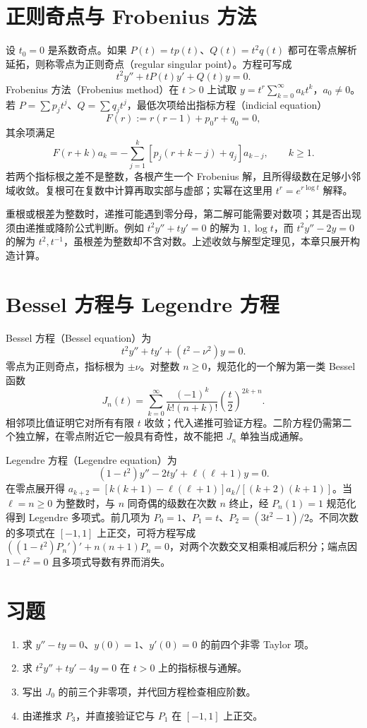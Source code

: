 \section{正则奇点与 Frobenius 方法}
设 $t_0=0$ 是系数奇点。如果 $P(t)=tp(t)$、$Q(t)=t^2q(t)$ 都可在零点解析延拓，则称零点为正则奇点（regular singular point）。方程可写成
\[
 t^2y''+tP(t)y'+Q(t)y=0.
\]
Frobenius 方法（Frobenius method）在 $t>0$ 上试取 $y=t^r\sum_{k=0}^\infty a_kt^k$，$a_0\ne0$。若 $P=\sum p_jt^j$、$Q=\sum q_jt^j$，最低次项给出指标方程（indicial equation）
\[
 F(r):=r(r-1)+p_0r+q_0=0,
\]
其余项满足
\[
 F(r+k)a_k=-\sum_{j=1}^k[p_j(r+k-j)+q_j]a_{k-j},\qquad k\geq1.
\]
若两个指标根之差不是整数，各根产生一个 Frobenius 解，且所得级数在足够小邻域收敛。复根可在复数中计算再取实部与虚部；实幂在这里用 $t^r=e^{r\log t}$ 解释。

重根或根差为整数时，递推可能遇到零分母，第二解可能需要对数项；其是否出现须由递推或降阶公式判断。例如 $t^2y''+ty'=0$ 的解为 $1,\log t$，而 $t^2y''-2y=0$ 的解为 $t^2,t^{-1}$，虽根差为整数却不含对数。上述收敛与解型定理见\cite[第4章]{teschl-ode}，本章只展开构造计算。

\section{Bessel 方程与 Legendre 方程}
Bessel 方程（Bessel equation）为
\[
 t^2y''+ty'+(t^2-\nu^2)y=0.
\]
零点为正则奇点，指标根为 $\pm\nu$。对整数 $n\geq0$，规范化的一个解为第一类 Bessel 函数
\[
 J_n(t)=\sum_{k=0}^\infty\frac{(-1)^k}{k!(n+k)!}\left(\frac t2\right)^{2k+n}.
\]
相邻项比值证明它对所有有限 $t$ 收敛；代入递推可验证方程。二阶方程仍需第二个独立解，在零点附近它一般具有奇性，故不能把 $J_n$ 单独当成通解。

Legendre 方程（Legendre equation）为
\[
 (1-t^2)y''-2ty'+\ell(\ell+1)y=0.
\]
在零点展开得 $a_{k+2}=[k(k+1)-\ell(\ell+1)]a_k/[(k+2)(k+1)]$。当 $\ell=n\geq0$ 为整数时，与 $n$ 同奇偶的级数在次数 $n$ 终止，经 $P_n(1)=1$ 规范化得到 Legendre 多项式。前几项为 $P_0=1$、$P_1=t$、$P_2=(3t^2-1)/2$。不同次数的多项式在 $[-1,1]$ 上正交，可将方程写成 $((1-t^2)P_n')'+n(n+1)P_n=0$，对两个次数交叉相乘相减后积分；端点因 $1-t^2=0$ 且多项式导数有界而消失。

\section{习题}
\begin{enumerate}
 \item\label{ex:ode-airy} 求 $y''-ty=0$、$y(0)=1$、$y'(0)=0$ 的前四个非零 Taylor 项。
 \item\label{ex:ode-frobenius} 求 $t^2y''+ty'-4y=0$ 在 $t>0$ 上的指标根与通解。
 \item 写出 $J_0$ 的前三个非零项，并代回方程检查相应阶数。
 \item 由递推求 $P_3$，并直接验证它与 $P_1$ 在 $[-1,1]$ 上正交。
\end{enumerate}

